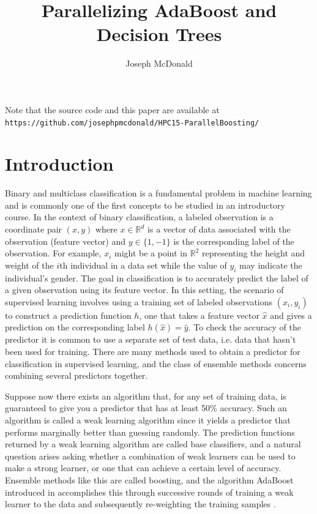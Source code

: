 \documentclass[12pt]{article}
\author{Joseph McDonald}
\title{Parallelizing AdaBoost and Decision Trees}
\begin{document}

\maketitle

\begin{center}
Note that the source code and this paper are available at\\ {\tt https://github.com/josephpmcdonald/HPC15-ParallelBoosting/}
\end{center}

\section{Introduction}

\indent Binary and multiclass classification is a fundamental
problem in machine learning and is commonly one of the first concepts to be
studied in an introductory course. In the context of binary classification, a
labeled observation is a coordinate pair $(x, y)$ where $x\in\mathbb{R}^d$ is a
vector of data associated with the observation (feature vector) and $y\in\{1,
-1\}$ is the corresponding label of the observation. For example, $x_i$ might
be a point in $\mathbb{R}^2$ representing the height and weight of the $i$th
individual in a data set while the value of $y_i$ may indicate the individual's
gender. The goal in classification is to accurately predict the label
of a given observation using its feature vector. In this setting, the scenario
of supervised learning involves using a training set of labeled observations
$(x_i, y_i)$ to construct a prediction function $h$, one that takes a feature
vector $\hat{x}$ and gives a prediction on the corresponding label
$h(\hat{x})=\hat{y}$. To check the accuracy of the predictor it is common to use a separate set of test data, i.e. data that hasn't been used for training. There are many methods used to obtain a predictor for classification in supervised
learning, and the class of ensemble methods concerns combining several
predictors together.

Suppose now there exists an algorithm that, for any set of training data, is
guaranteed to give you a predictor that has at least 50\% accuracy. Such an
algorithm is called a weak learning algorithm since it yields a predictor that
performs marginally better than guessing randomly. The prediction functions
returned by a weak learning algorithm are called base classifiers, and a
natural question arises asking whether a combination of weak learners can be used
to make a strong learner, or one that can achieve a certain level of accuracy.
Ensemble methods like this are called boosting, and the
algorithm AdaBoost introduced in \cite{FS} accomplishes this through
successive rounds of training a weak learner to the data and subsequently
re-weighting the training samples \cite{FS}.
\end{document}
